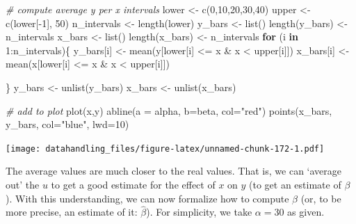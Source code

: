 \documentclass[
  12pt,
]{style/krantz}
\newenvironment{Shaded}{\begin{snugshade}}{\end{snugshade}}
\newcommand{\AttributeTok}[1]{\textcolor[rgb]{0.77,0.63,0.00}{#1}}
\newcommand{\CommentTok}[1]{\textcolor[rgb]{0.56,0.35,0.01}{\textit{#1}}}
\newcommand{\ControlFlowTok}[1]{\textcolor[rgb]{0.13,0.29,0.53}{\textbf{#1}}}
\newcommand{\DecValTok}[1]{\textcolor[rgb]{0.00,0.00,0.81}{#1}}
\newcommand{\FunctionTok}[1]{\textcolor[rgb]{0.00,0.00,0.00}{#1}}
\newcommand{\NormalTok}[1]{#1}
\newcommand{\OtherTok}[1]{\textcolor[rgb]{0.56,0.35,0.01}{#1}}
\newcommand{\SpecialCharTok}[1]{\textcolor[rgb]{0.00,0.00,0.00}{#1}}
\newcommand{\StringTok}[1]{\textcolor[rgb]{0.31,0.60,0.02}{#1}}
\begin{document}
\begin{Shaded}
\begin{Highlighting}[]
\CommentTok{\# compute average y per x intervals}
\NormalTok{lower }\OtherTok{\textless{}{-}} \FunctionTok{c}\NormalTok{(}\DecValTok{0}\NormalTok{,}\DecValTok{10}\NormalTok{,}\DecValTok{20}\NormalTok{,}\DecValTok{30}\NormalTok{,}\DecValTok{40}\NormalTok{)}
\NormalTok{upper }\OtherTok{\textless{}{-}} \FunctionTok{c}\NormalTok{(lower[}\SpecialCharTok{{-}}\DecValTok{1}\NormalTok{], }\DecValTok{50}\NormalTok{)}
\NormalTok{n\_intervals }\OtherTok{\textless{}{-}} \FunctionTok{length}\NormalTok{(lower)}
\NormalTok{y\_bars }\OtherTok{\textless{}{-}} \FunctionTok{list}\NormalTok{()}
\FunctionTok{length}\NormalTok{(y\_bars) }\OtherTok{\textless{}{-}}\NormalTok{ n\_intervals}
\NormalTok{x\_bars }\OtherTok{\textless{}{-}} \FunctionTok{list}\NormalTok{()}
\FunctionTok{length}\NormalTok{(x\_bars) }\OtherTok{\textless{}{-}}\NormalTok{ n\_intervals}
\ControlFlowTok{for}\NormalTok{ (i }\ControlFlowTok{in} \DecValTok{1}\SpecialCharTok{:}\NormalTok{n\_intervals)\{}
\NormalTok{  y\_bars[i] }\OtherTok{\textless{}{-}} \FunctionTok{mean}\NormalTok{(y[lower[i] }\SpecialCharTok{\textless{}=}\NormalTok{ x }\SpecialCharTok{\&}\NormalTok{ x }\SpecialCharTok{\textless{}}\NormalTok{ upper[i]])}
\NormalTok{  x\_bars[i] }\OtherTok{\textless{}{-}} \FunctionTok{mean}\NormalTok{(x[lower[i] }\SpecialCharTok{\textless{}=}\NormalTok{ x }\SpecialCharTok{\&}\NormalTok{ x }\SpecialCharTok{\textless{}}\NormalTok{ upper[i]])}

\NormalTok{\}}
\NormalTok{y\_bars }\OtherTok{\textless{}{-}} \FunctionTok{unlist}\NormalTok{(y\_bars)}
\NormalTok{x\_bars }\OtherTok{\textless{}{-}} \FunctionTok{unlist}\NormalTok{(x\_bars)}

\CommentTok{\# add to plot}
\FunctionTok{plot}\NormalTok{(x,y)}
\FunctionTok{abline}\NormalTok{(}\AttributeTok{a =}\NormalTok{ alpha, }\AttributeTok{b=}\NormalTok{beta, }\AttributeTok{col=}\StringTok{"red"}\NormalTok{)}
\FunctionTok{points}\NormalTok{(x\_bars, y\_bars, }\AttributeTok{col=}\StringTok{"blue"}\NormalTok{, }\AttributeTok{lwd=}\DecValTok{10}\NormalTok{)}
\end{Highlighting}
\end{Shaded}

\texttt{[image: datahandling\_files/figure-latex/unnamed-chunk-172-1.pdf]}

The average values are much closer to the real values. That is, we can `average out' the \(u\) to get a good estimate for the effect of \(x\) on \(y\) (to get an estimate of \(\beta\)). With this understanding, we can now formalize how to compute \(\beta\) (or, to be more precise, an estimate of it: \(\hat{\beta}\)). For simplicity, we take \(\alpha=30\) as given.
\end{document}
